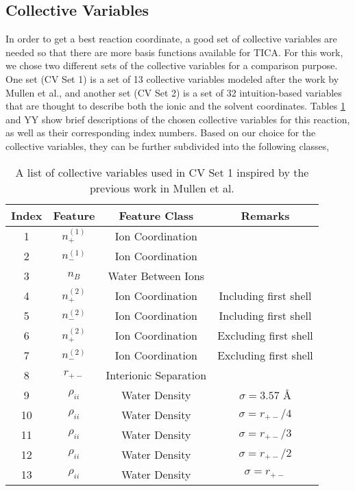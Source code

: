 \begin{spacing}{2.0}
    \subsection{Collective Variables}

    In order to get a best reaction coordinate, a good set of collective variables are needed so that there are more basis functions available for
    TICA. For this work, we chose two different sets of the collective variables for a comparison purpose. One set (CV Set 1) is a set of 13 
    collective variables modeled after the work by Mullen et al., and another set (CV Set 2) is a set of 32 intuition-based variables that are 
    thought to describe both the ionic and the solvent coordinates. Tables \ref{tab:cv-set-1} and YY show brief descriptions of the chosen 
    collective variables for this reaction, as well as their corresponding index numbers. Based on our choice for the collective variables, they 
    can be further subdivided into the following classes,

    \begin{table}[h]
        \centering
        \caption{A list of collective variables used in CV Set 1 inspired by the previous work in Mullen et al.}
        \label{tab:cv-set-1}
        \begin{tabular}{|c|c|c|c|}
            \hline
            \textbf{Index} & \textbf{Feature} & \textbf{Feature Class} & \textbf{Remarks} \\ \hline
            1 & $n_+^{(1)}$ & Ion Coordination & \\
            2 & $n_-^{(1)}$ & Ion Coordination & \\
            3 & $n_B$ & Water Between Ions & \\
            4 & $n_+^{(2)}$ & Ion Coordination & Including first shell \\ 
            5 & $n_-^{(2)}$ & Ion Coordination & Including first shell \\
            6 & $n_+^{(2)}$ & Ion Coordination & Excluding first shell \\ 
            7 & $n_-^{(2)}$ & Ion Coordination & Excluding first shell \\
            8 & $r_{+-}$ & Interionic Separation & \\
            9 & $\rho_{ii}$ & Water Density & $\sigma = 3.57$ \r{A} \\
            10 & $\rho_{ii}$ & Water Density & $\sigma = r_{+-}/4$ \\
            11 & $\rho_{ii}$ & Water Density & $\sigma = r_{+-}/3$ \\
            12 & $\rho_{ii}$ & Water Density & $\sigma = r_{+-}/2$ \\
            13 & $\rho_{ii}$ & Water Density & $\sigma = r_{+-}$ \\ \hline
        \end{tabular}
    \end{table}


\end{spacing}
